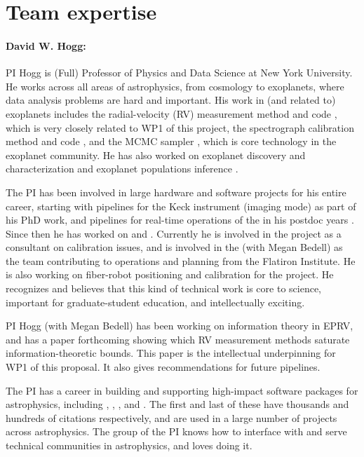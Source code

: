 \documentclass[12pt]{article}
\begin{document}
\clearpage
{}
\section*{Team expertise}

\paragraph{David W. Hogg:}
PI Hogg is (Full) Professor of Physics and Data Science at New York University. He works across all areas of astrophysics, from cosmology to exoplanets, where data analysis problems are hard and important.
His work in (and related to) exoplanets includes the radial-velocity (RV) measurement method and code  \cite{Bedell2019}, which is very closely related to WP1 of this project, the spectrograph calibration method and code  \cite{excalibur}, and the MCMC sampler  \cite{emcee}, which is core technology in the exoplanet community.
He has also worked on exoplanet discovery and characterization \cite{DFMK2, keplersingles} and exoplanet populations inference \cite{myers, exopop}.

The PI has been involved in large hardware and software projects for his entire career, starting with pipelines for the Keck  instrument (imaging mode) as part of his PhD work, and pipelines for real-time operations of the  in his postdoc years \cite{hoggpt}.
Since then he has worked on  and .
Currently he is involved in the  project as a consultant on calibration issues, and is involved in the  (with Megan Bedell) as the team contributing to operations and planning from the Flatiron Institute.
He is also working on fiber-robot positioning and calibration for the  project.
He recognizes and believes that this kind of technical work is core to science, important for graduate-student education, and intellectually exciting.

PI Hogg (with Megan Bedell) has been working on information theory in EPRV, and has a paper forthcoming showing which RV measurement methods saturate information-theoretic bounds. This paper is the intellectual underpinning for WP1 of this proposal.
It also gives recommendations for future pipelines.

The PI has a career in building and supporting high-impact software packages for astrophysics, including  \cite{emcee},  \cite{Cannon, Cannon2},  \cite{joker}, and  \cite{an}.
The first and last of these have thousands and hundreds of citations respectively, and are used in a large number of projects across astrophysics.
The group of the PI knows how to interface with and serve technical communities in astrophysics, and loves doing it.
\end{document}
